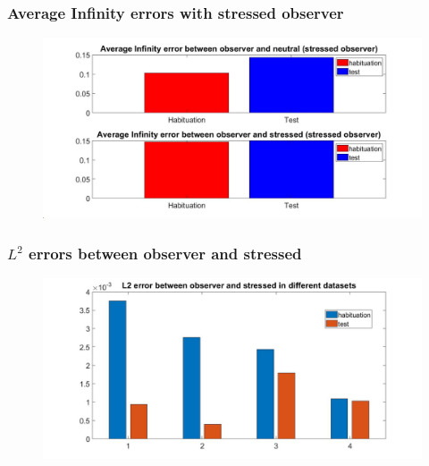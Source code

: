 \documentclass{beamer}
\begin{document}
\begin{frame}
\frametitle{Average Infinity errors with stressed observer}

\begin{figure}[H]
	\begin{center}
		\hspace*{-1.7cm}
		\includegraphics[scale=.32]{avg_inf2.jpg} 
	\end{center}  
	
	
\end{figure}


\end{frame}




\begin{frame}
\frametitle{ $L^2$ errors between observer and stressed}



\begin{figure}[H]
	\begin{center}
		\hspace*{-1.7cm}
		\includegraphics[scale=.32]{L2_err_stress.jpg} 
	\end{center}  
	
	
\end{figure}

\end{frame}
\end{document}
